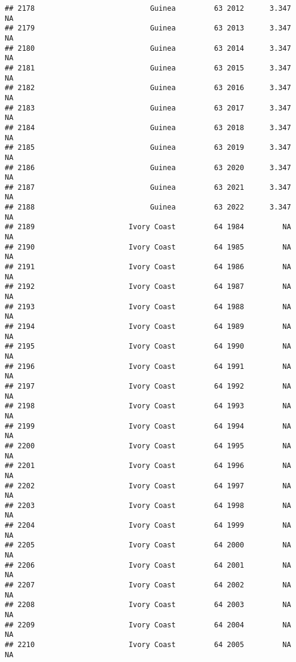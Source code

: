 \documentclass[
]{article}
\begin{document}
\begin{verbatim}
## 2178                           Guinea         63 2012      3.347         NA
## 2179                           Guinea         63 2013      3.347         NA
## 2180                           Guinea         63 2014      3.347         NA
## 2181                           Guinea         63 2015      3.347         NA
## 2182                           Guinea         63 2016      3.347         NA
## 2183                           Guinea         63 2017      3.347         NA
## 2184                           Guinea         63 2018      3.347         NA
## 2185                           Guinea         63 2019      3.347         NA
## 2186                           Guinea         63 2020      3.347         NA
## 2187                           Guinea         63 2021      3.347         NA
## 2188                           Guinea         63 2022      3.347         NA
## 2189                      Ivory Coast         64 1984         NA         NA
## 2190                      Ivory Coast         64 1985         NA         NA
## 2191                      Ivory Coast         64 1986         NA         NA
## 2192                      Ivory Coast         64 1987         NA         NA
## 2193                      Ivory Coast         64 1988         NA         NA
## 2194                      Ivory Coast         64 1989         NA         NA
## 2195                      Ivory Coast         64 1990         NA         NA
## 2196                      Ivory Coast         64 1991         NA         NA
## 2197                      Ivory Coast         64 1992         NA         NA
## 2198                      Ivory Coast         64 1993         NA         NA
## 2199                      Ivory Coast         64 1994         NA         NA
## 2200                      Ivory Coast         64 1995         NA         NA
## 2201                      Ivory Coast         64 1996         NA         NA
## 2202                      Ivory Coast         64 1997         NA         NA
## 2203                      Ivory Coast         64 1998         NA         NA
## 2204                      Ivory Coast         64 1999         NA         NA
## 2205                      Ivory Coast         64 2000         NA         NA
## 2206                      Ivory Coast         64 2001         NA         NA
## 2207                      Ivory Coast         64 2002         NA         NA
## 2208                      Ivory Coast         64 2003         NA         NA
## 2209                      Ivory Coast         64 2004         NA         NA
## 2210                      Ivory Coast         64 2005         NA         NA

\end{verbatim}
\end{document}
